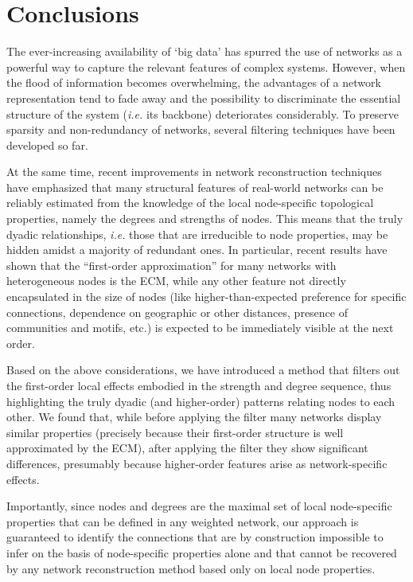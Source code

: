 \documentclass[aps,twocolumn,superscriptaddress]{revtex4-1}
\newcommand{\ie}{\emph{i.e.} }
\begin{document}
\section{Conclusions\label{sec:conclusions}}

The ever-increasing availability of `big data' has spurred the use of networks as a powerful way to capture the relevant features of complex systems. However, when the flood of information becomes overwhelming, the advantages of a network representation tend to fade away and the possibility to discriminate the essential structure of the system (\ie its backbone) deteriorates considerably. 
To preserve sparsity and non-redundancy of networks, several filtering techniques have been developed so far. 

At the same time, recent improvements in network reconstruction techniques have emphasized that many structural features of real-world networks can be reliably estimated from the knowledge of the local node-specific topological properties, namely the degrees and strengths of nodes. 
This means that the truly dyadic relationships, \ie those that are irreducible to node properties, may be hidden amidst a majority of redundant ones.
In particular, recent results have shown that the ``first-order approximation'' for many networks with heterogeneous nodes is the ECM, while any other feature not directly encapsulated in the size of nodes (like higher-than-expected preference for specific connections, dependence on geographic or other distances, presence of communities and motifs, etc.) is expected to be immediately visible at the next order. 

Based on the above considerations, we have introduced a method that filters out the first-order local effects embodied in the strength and degree sequence, thus highlighting the truly dyadic (and higher-order) patterns relating nodes to each other. 
We found that, while before applying the filter many networks display similar properties (precisely because their first-order structure is well approximated by the ECM), after applying the filter they show significant differences, presumably because higher-order features arise as network-specific effects.

Importantly, since nodes and degrees are the maximal set of local node-specific properties that can be defined in any weighted network, our approach is guaranteed to identify the connections that are by construction impossible to infer on the basis of node-specific properties alone and that cannot be recovered by any network reconstruction method based only on local node properties.
\end{document}
